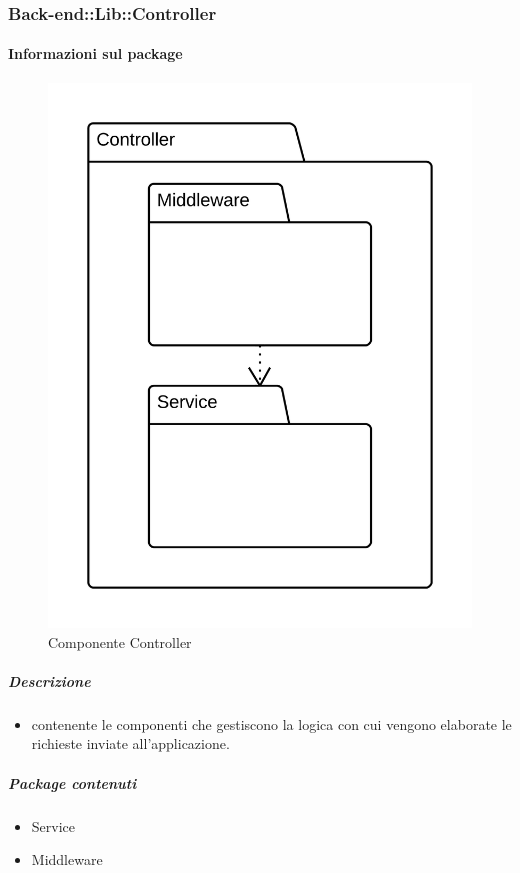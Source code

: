 	\subsubsection{Back-end::Lib::Controller}
	\paragraph{Informazioni sul package} 
		\begin{figure}[H] 
			\begin{center} 
				\includegraphics[scale=0.15]{uml/package/Back-end::Lib::Controller.png}  
				\caption{Componente Controller}
			\end{center}  
		\end{figure} 
	\subparagraph{Descrizione} 
		\begin{itemize}
		\item[]  contenente le componenti che gestiscono la logica con cui vengono elaborate le richieste inviate all’applicazione.
		\end{itemize} 
		\subparagraph{Package contenuti} 
		\begin{itemize}
				\item Service
				\item Middleware
		\end{itemize}
